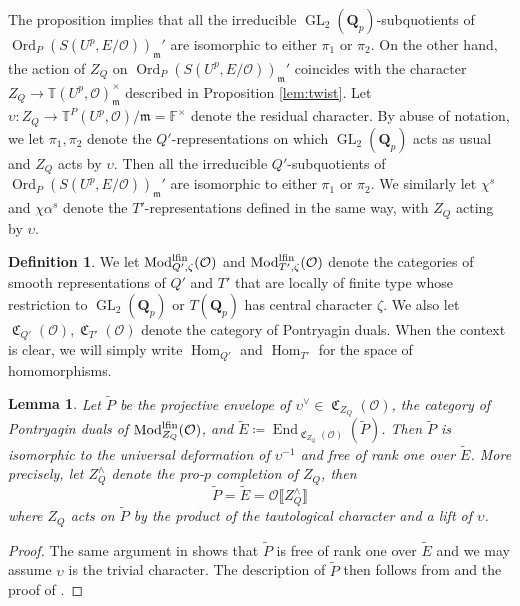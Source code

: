 \documentclass[leqno]{amsart}
\newtheorem{lem}[thm]{Lemma}
\theoremstyle{definition}
\newtheorem{defn}[thm]{Definition}
\theoremstyle{remark}
\newcommand{\oo}{\mathcal{O}}
\newcommand{\fF}{\mathbb{F}} %
\newcommand{\Qp}{\mathbf{Q}_p}
\DeclareMathOperator{\End}{End}
\DeclareMathOperator{\Hom}{Hom}
\DeclareMathOperator{\GL}{GL}
\newcommand{\fm}{\mathfrak{m}}
\DeclareMathOperator{\Mod}{\textnormal{Mod}}
\DeclareMathOperator{\fC}{\mathfrak{C}} %
\DeclareMathOperator{\Ord}{Ord} %
\newcommand{\lfin}{\textnormal{lfin}}
\newcommand{\TT}{\mathbb{T}} %
\begin{document}
The proposition implies that
all the irreducible $\GL_2(\Qp)$-subquotients
of $\Ord_P(S(U^p,E/\oo))_\fm'$ are 
isomorphic to either $\pi_1$ or $\pi_2$.
On the other hand, the action of $Z_Q$
on $\Ord_P(S(U^p,E/\oo))_\fm'$ coincides 
with the character 
$Z_Q\to \TT(U^p,\oo)_{\fm}^{\times}$
described in Proposition \ref{lem:twist}.
Let $\upsilon\colon Z_Q\to \TT^P(U^p,\oo)/\fm=\fF^\times$
denote the residual character.
By abuse of notation,
we let $\pi_1,\pi_2$ denote
the $Q'$-representations on which $\GL_2(\Qp)$ acts as usual
and $Z_Q$ acts by $\upsilon$.
Then all the irreducible $Q'$-subquotients
of $\Ord_P(S(U^p,E/\oo))_\fm'$ are 
isomorphic to either $\pi_1$ or $\pi_2$.
We similarly let $\chi^s$ and $\chi\alpha^s$ denote
the $T'$-representations defined in the same way,
with $Z_Q$ acting by $\upsilon$.

\begin{defn}

We let $\Mod^{\lfin}_{Q',\zeta}(\oo)$
and $\Mod^{\lfin}_{T',\zeta}(\oo)$
denote the categories of smooth representations of 
$Q'$ and $T'$ that are locally of finite type
whose restriction to $\GL_2(\Qp)$ or $T(\Qp)$
has central character $\zeta$.
We also let $\fC_{Q'}(\oo), \fC_{T'}(\oo)$
denote the category of Pontryagin duals.
When the context is clear,
we will simply write $\Hom_{Q'}$ and $\Hom_{T'}$
for the space of homomorphisms.
\end{defn}

\begin{lem}\label{lem:end_comp}
Let $\tilde{P}$ be the projective envelope of 
$\upsilon^\vee\in \fC_{Z_Q}(\oo)$, the category
of Pontryagin duals of $\Mod_{Z_Q}^{\lfin}(\oo)$,
and $\tilde{E}\coloneqq\End_{\fC_{Z_Q}(\oo)}(\tilde{P})$.
Then $\tilde{P}$ is isomorphic to 
the universal deformation of $\upsilon^{-1}$
and free of rank one over $\tilde{E}$.
More precisely,
let $Z_Q^\wedge$ denote the pro-$p$ completion of $Z_Q$, then
\[
    \tilde{P}=\tilde{E}
    =\oo\llbracket Z_Q^\wedge\rrbracket
\]
where $Z_Q$ acts on $\tilde{P}$
by the product of the tautological character
and a lift of $\upsilon$.
\end{lem}
\begin{proof}
The same argument in \cite[Prop. 3.34]{pask} 
shows that $\tilde{P}$
is free of rank one over $\tilde{E}$
and we may assume $\upsilon$ is the trivial character.
The description of $\tilde{P}$ then follows from 
\cite[Cor. 3.27]{pask} and the proof of
\cite[Lem. 3.32]{pask}.
\end{proof}
\end{document}
